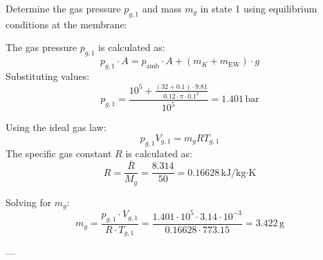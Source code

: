 Determine the gas pressure \( p_{g,1} \) and mass \( m_g \) in state 1 using equilibrium conditions at the membrane:  

The gas pressure \( p_{g,1} \) is calculated as:  
\[
p_{g,1} \cdot A = p_{\text{amb}} \cdot A + (m_K + m_{\text{EW}}) \cdot g
\]  
Substituting values:  
\[
p_{g,1} = \frac{10^5 + \frac{(32 + 0.1) \cdot 9.81}{0.12 \cdot \pi \cdot 0.1^2}}{10^5} = 1.401 \, \text{bar}
\]  

Using the ideal gas law:  
\[
p_{g,1} V_{g,1} = m_g R T_{g,1}
\]  
The specific gas constant \( R \) is calculated as:  
\[
R = \frac{\bar{R}}{M_g} = \frac{8.314}{50} = 0.16628 \, \text{kJ/kg·K}
\]  

Solving for \( m_g \):  
\[
m_g = \frac{p_{g,1} \cdot V_{g,1}}{R \cdot T_{g,1}} = \frac{1.401 \cdot 10^5 \cdot 3.14 \cdot 10^{-3}}{0.16628 \cdot 773.15} = 3.422 \, \text{g}
\]  

---